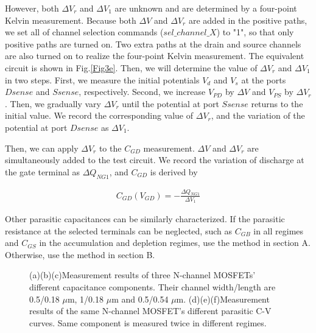 \documentclass[journal]{IEEEtran}
\begin{document}
However, both $\Delta V_{r}$ and $\Delta V_{1}$ are unknown and are determined by a four-point Kelvin measurement. Because both $\Delta V$ and $\Delta V_{r}$ are added in the positive paths, we set all of channel selection commands ($sel\_channel\_X$) to "1", so that only positive paths are turned on. Two extra paths at the drain and source channels are also turned on to realize the four-point Kelvin measurement. The equivalent circuit is shown in Fig.\ref{Fig3e}. Then, we will determine the value of $\Delta V_{r}$ and $\Delta V_{1}$ in two steps. First, we measure the initial potentials $V_{d}$ and $V_{s}$ at the ports $Dsense$ and $Ssense$, respectively. Second, we increase $V_{PD}$ by $\Delta V$ and $V_{PS}$ by $\Delta V_{r}$. Then, we gradually vary $\Delta V_{r}$ until the potential at port $Ssense$ returns to the initial value. We record the corresponding value of $\Delta V_{r}$, and the variation of the potential at port $Dsense$ as $\Delta V_{1}$. 

Then, we can apply $\Delta V_{r}$ to the $C_{GD}$ measurement. $\Delta V$ and $\Delta V_{r}$ are simultaneously added to the test circuit. We record the variation of discharge at the gate terminal as $\Delta Q_{NG1}$, and $C_{GD}$ is derived by  

\begin{align}
  C_{GD}(V_{GD})=-\frac{\Delta Q_{NG1}}{\Delta V_{1}}
\end{align}


Other parasitic capacitances can be similarly characterized. If the parasitic resistance at the selected terminals can be neglected, such as $C_{GB}$ in all regimes and $C_{GS}$ in the accumulation and depletion regimes, use the method in section A. Otherwise, use the method in section B.





\begin{figure*}
\centering
{}

\caption{(a)(b)(c)Measurement results of three N-channel MOSFETs' different capacitance components. Their channel width/length are 0.5/0.18 $\mu$m, 1/0.18 $\mu$m and 0.5/0.54 $\mu$m. (d)(e)(f)Measurement results of the same N-channel MOSFET's different parasitic C-V curves. Same component is measured twice in different regimes.}
\label{Fig5}
\end{figure*}
\end{document}
